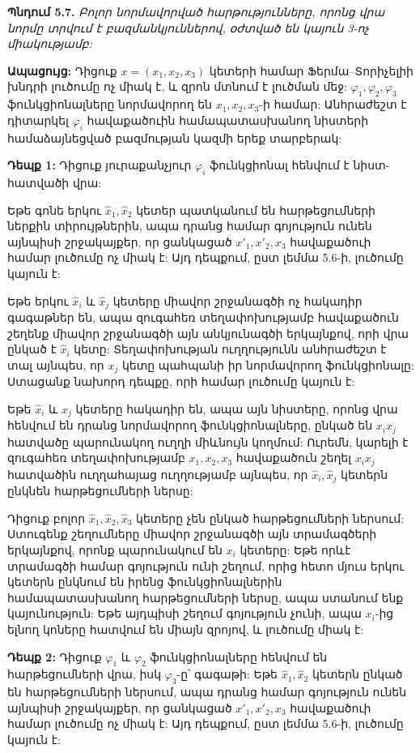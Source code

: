 \documentclass[12pt,a4paper]{article}
\numberwithin{equation}{section}
\numberwithin{figure}{section}
\begin{document}
\textbf{Պնդում 5.7.} \textit{Բոլոր նորմավորված հարթությունները, որոնց վրա նորմը տրվում է բազմանկյուններով, օժտված են կայուն 3-ոչ միակությամբ:}

\textbf{Ապացույց:} Դիցուք $x = (x_1, x_2, x_3)$ կետերի համար Ֆերմա--Տորիչելիի խնդրի լուծումը ոչ միակ է, և զրոն մտնում է լուծման մեջ: $\varphi_1, \varphi_2, \varphi_3$ ֆունկցիոնալները նորմավորող են $x_1, x_2, x_3$-ի համար: Անհրաժեշտ է դիտարկել $\varphi_i$ հավաքածուին համապատասխանող նիստերի համաձայնեցված բազմության կազմի երեք տարբերակ:

\textbf{Դեպք 1:} Դիցուք յուրաքանչյուր $\varphi_i$ ֆունկցիոնալ հենվում է նիստ-հատվածի վրա:

Եթե գոնե երկու $\hat{x}_1, \hat{x}_2$ կետեր պատկանում են հարթեցումների ներքին տիրույթներին, ապա դրանց համար գոյություն ունեն այնպիսի շրջակայքեր, որ ցանկացած $x'_1, x'_2, x_3$ հավաքածուի համար լուծումը ոչ միակ է: Այդ դեպքում, ըստ լեմմա 5.6-ի, լուծումը կայուն է:

Եթե երկու $\hat{x}_i$ և $\hat{x}_j$ կետերը միավոր շրջանագծի ոչ հակադիր գագաթներ են, ապա զուգահեռ տեղափոխությամբ հավաքածուն շեղենք միավոր շրջանագծի այն անկյունագծի երկայնքով, որի վրա ընկած է $\hat{x}_i$ կետը: Տեղափոխության ուղղությունն անհրաժեշտ է տալ այնպես, որ $x_j$ կետը պահպանի իր նորմավորող ֆունկցիոնալը: Ստացանք նախորդ դեպքը, որի համար լուծումը կայուն է:

Եթե $\hat{x}_i$ և $\hat{x}_j$ կետերը հակադիր են, ապա այն նիստերը, որոնց վրա հենվում են դրանց նորմավորող ֆունկցիոնալները, ընկած են $x_i x_j$ հատվածը պարունակող ուղղի միևնույն կողմում: Ուրեմն, կարելի է զուգահեռ տեղափոխությամբ $x_1, x_2, x_3$ հավաքածուն շեղել $x_i x_j$ հատվածին ուղղահայաց ուղղությամբ այնպես, որ $\hat{x}_i, \hat{x}_j$ կետերն ընկնեն հարթեցումների ներսը:

Դիցուք բոլոր $\hat{x}_1, \hat{x}_2, \hat{x}_3$ կետերը չեն ընկած հարթեցումների ներսում: Ստուգենք շեղումները միավոր շրջանագծի այն տրամագծերի երկայնքով, որոնք պարունակում են $x_i$ կետերը: Եթե որևէ տրամագծի համար գոյություն ունի շեղում, որից հետո մյուս երկու կետերն ընկնում են իրենց ֆունկցիոնալներին համապատասխանող հարթեցումների ներսը, ապա ստանում ենք կայունություն: Եթե այդպիսի շեղում գոյություն չունի, ապա $x_i$-ից ելնող կոները հատվում են միայն զրոյով, և լուծումը միակ է:

\textbf{Դեպք 2:} Դիցուք $\varphi_1$ և $\varphi_2$ ֆունկցիոնալները հենվում են հարթեցումների վրա, իսկ $\varphi_3$-ը՝ գագաթի: Եթե $\hat{x}_1, \hat{x}_2$ կետերն ընկած են հարթեցումների ներսում, ապա դրանց համար գոյություն ունեն այնպիսի շրջակայքեր, որ ցանկացած $x'_1, x'_2, x_3$ հավաքածուի համար լուծումը ոչ միակ է: Այդ դեպքում, ըստ լեմմա 5.6-ի, լուծումը կայուն է:
\end{document}
